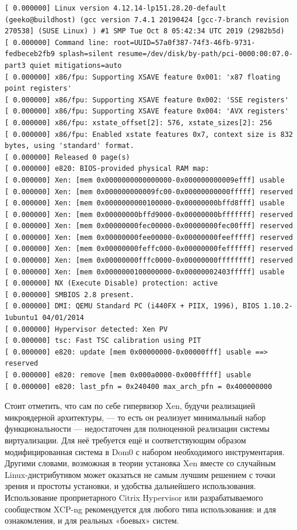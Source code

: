 \documentclass[14pt, a4paper]{article}
\begin{document}
\begin{lstlisting}
[ 0.000000] Linux version 4.12.14-lp151.28.20-default (geeko@buildhost) (gcc version 7.4.1 20190424 [gcc-7-branch revision 270538] (SUSE Linux) ) #1 SMP Tue Oct 8 05:42:34 UTC 2019 (2982b5d)
[ 0.000000] Command line: root=UUID=57a0f387-74f3-46fb-9731-fedbeceb2fb9 splash=silent resume=/dev/disk/by-path/pci-0000:00:07.0-part3 quiet mitigations=auto
[ 0.000000] x86/fpu: Supporting XSAVE feature 0x001: 'x87 floating point registers'
[ 0.000000] x86/fpu: Supporting XSAVE feature 0x002: 'SSE registers'
[ 0.000000] x86/fpu: Supporting XSAVE feature 0x004: 'AVX registers'
[ 0.000000] x86/fpu: xstate_offset[2]: 576, xstate_sizes[2]: 256
[ 0.000000] x86/fpu: Enabled xstate features 0x7, context size is 832 bytes, using 'standard' format.
[ 0.000000] Released 0 page(s)
[ 0.000000] e820: BIOS-provided physical RAM map:
[ 0.000000] Xen: [mem 0x0000000000000000-0x000000000009efff] usable
[ 0.000000] Xen: [mem 0x000000000009fc00-0x00000000000fffff] reserved
[ 0.000000] Xen: [mem 0x0000000000100000-0x00000000bffd8fff] usable
[ 0.000000] Xen: [mem 0x00000000bffd9000-0x00000000bfffffff] reserved
[ 0.000000] Xen: [mem 0x00000000fec00000-0x00000000fec00fff] reserved
[ 0.000000] Xen: [mem 0x00000000fee00000-0x00000000feefffff] reserved
[ 0.000000] Xen: [mem 0x00000000feffc000-0x00000000feffffff] reserved
[ 0.000000] Xen: [mem 0x00000000fffc0000-0x00000000ffffffff] reserved
[ 0.000000] Xen: [mem 0x0000000100000000-0x00000002403fffff] usable
[ 0.000000] NX (Execute Disable) protection: active
[ 0.000000] SMBIOS 2.8 present.
[ 0.000000] DMI: QEMU Standard PC (i440FX + PIIX, 1996), BIOS 1.10.2-1ubuntu1 04/01/2014
[ 0.000000] Hypervisor detected: Xen PV
[ 0.000000] tsc: Fast TSC calibration using PIT
[ 0.000000] e820: update [mem 0x00000000-0x00000fff] usable ==> reserved
[ 0.000000] e820: remove [mem 0x000a0000-0x000fffff] usable
[ 0.000000] e820: last_pfn = 0x240400 max_arch_pfn = 0x400000000
\end{lstlisting}

Стоит отметить, что сам по себе гипервизор Xen, будучи реализацией микроядерной архитектуры, —
то есть он реализует минимальный набор функциональности — недостаточен для полноценной
реализации системы виртуализации. Для неё требуется ещё и соответствующим образом
модифицированная система в Dom0 с набором необходимого инструментария. Другими словами,
возможная в теории установка Xen вместе со случайным Linux-дистрибутивом может оказаться не
самым лучшим решением с точки зрения и простоты установки, и удобства дальнейшего
использования. Использование проприетарного Citrix Hypervisor или разрабатываемого сообществом
XCP-ng рекомендуется для любого типа использования: и для ознакомления, и для реальных
«боевых» систем.\\
\end{document}
